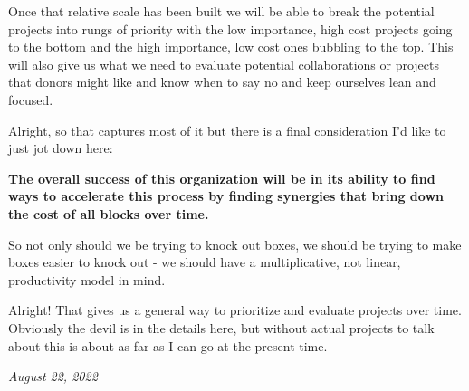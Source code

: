 \documentclass[10pt,a5paper]{book}
\begin{document}
Once that relative scale has been built we will be able to break the potential projects into rungs of priority with the low importance, high cost projects going to the bottom and the high importance, low cost ones bubbling to the top. This will also give us what we need to evaluate potential collaborations or projects that donors might like and know when to say no and keep ourselves lean and focused. 

Alright, so that captures most of it but there is a final consideration I'd like to just jot down here: \linebreak

\textbf{The overall success of this organization will be in its ability to find ways to accelerate this process by finding synergies that bring down the cost of all blocks over time.} \linebreak

So not only should we be trying to knock out boxes, we should be trying to make boxes easier to knock out - we should have a multiplicative, not linear, productivity model in mind. 

Alright! That gives us a general way to prioritize and evaluate projects over time. Obviously the devil is in the details here, but without actual projects to talk about this is about as far as I can go at the present time. 

\textit{August 22, 2022}
\end{document}
